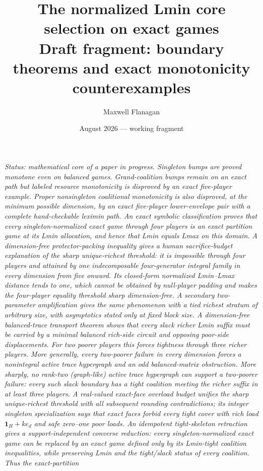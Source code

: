 \documentclass[11pt]{article}
\title{The normalized Lmin core selection on exact games\\[4pt]
\large Draft fragment: boundary theorems and exact monotonicity counterexamples}
\author{Maxwell Flanagan}
\date{August 2026 --- working fragment}
\begin{document}
\maketitle
\noindent\emph{Status: mathematical core of a paper in progress. Singleton
bumps are proved monotone even on balanced games.  Grand-coalition bumps remain
on an exact path but labeled resource monotonicity is disproved by an exact
five-player example.  Proper nonsingleton coalitional monotonicity is also
disproved, at the minimum possible dimension, by an exact five-player
lower-envelope pair with a complete hand-checkable leximin path.  An exact
symbolic classification proves that every singleton-normalized exact game
through four players is an exact partition game at its Lmin allocation, and
hence that Lmin equals Lmax on this domain.  A dimension-free protector-packing
inequality gives a human sacrifice-budget explanation of the sharp
unique-richest threshold: it is impossible through four players and attained
by one indecomposable four-generator integral family in every dimension from
five onward.  Its closed-form normalized Lmin--Lmax distance tends to one,
which cannot be obtained by null-player padding and makes the four-player
equality threshold sharp dimension-free.  A secondary two-parameter
amplification gives the same phenomenon with a tied richest stratum of
arbitrary size, with asymptotics stated only at fixed block size.
A dimension-free balanced-trace transport theorem shows that every slack
richer Lmin suffix must be carried by a minimal balanced rich-side circuit and
opposing poor-side displacements.  For two poorer players this forces
tightness through three richer players.  More generally, every two-poorer
failure in every dimension forces a nonintegral active trace hypergraph and
an odd balanced-matrix obstruction.  More sharply, no rank-two (graph-like)
active trace hypergraph can support a two-poorer failure: every such slack
boundary has a tight coalition meeting the richer suffix in at least three
players.  A real-valued exact-face overload budget unifies the sharp
unique-richest threshold with all subsequent rounding contradictions; its
integer singleton specialization says that exact faces forbid every tight
cover with rich load $\mathbf1_H+k e_d$ and safe zero--one poor loads.
An idempotent tight-skeleton retraction gives a support-independent converse
reduction: every singleton-normalized exact game can be replaced by an exact
game defined only by its Lmin-tight coalition inequalities, while preserving
Lmin and the tight/slack status of every coalition.  Thus the exact-partition
}
\end{document}
